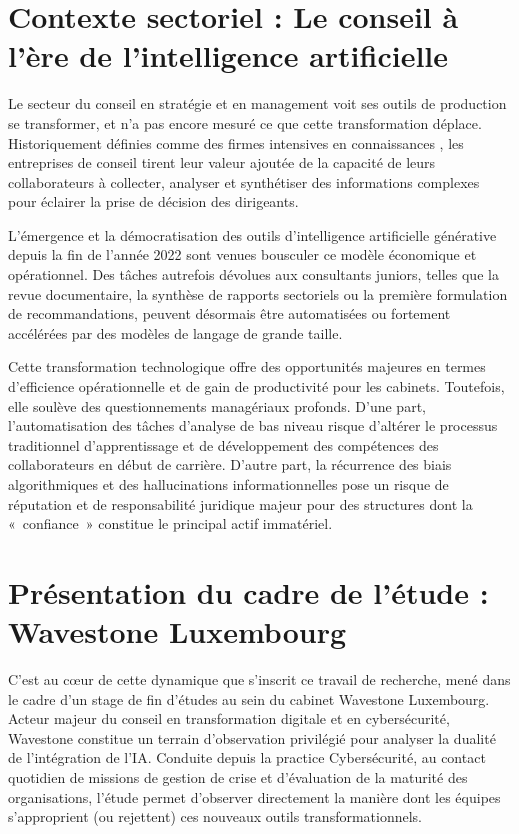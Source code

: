 \section{Contexte sectoriel : Le conseil à l'ère de l'intelligence artificielle}
Le secteur du conseil en stratégie et en management voit ses outils de production se transformer, et n'a pas encore mesuré ce que cette transformation déplace. Historiquement définies comme des firmes intensives en connaissances \cite{starbuck1992}, les entreprises de conseil tirent leur valeur ajoutée de la capacité de leurs collaborateurs à collecter, analyser et synthétiser des informations complexes pour éclairer la prise de décision des dirigeants. 

L'émergence et la démocratisation des outils d'intelligence artificielle générative depuis la fin de l'année 2022 sont venues bousculer ce modèle économique et opérationnel. Des tâches autrefois dévolues aux consultants juniors, telles que la revue documentaire, la synthèse de rapports sectoriels ou la première formulation de recommandations, peuvent désormais être automatisées ou fortement accélérées par des modèles de langage de grande taille. 

Cette transformation technologique offre des opportunités majeures en termes d'efficience opérationnelle et de gain de productivité pour les cabinets. Toutefois, elle soulève des questionnements managériaux profonds. D'une part, l'automatisation des tâches d'analyse de bas niveau risque d'altérer le processus traditionnel d'apprentissage et de développement des compétences des collaborateurs en début de carrière. D'autre part, la récurrence des biais algorithmiques et des hallucinations informationnelles pose un risque de réputation et de responsabilité juridique majeur pour des structures dont la «~confiance~» constitue le principal actif immatériel.

\section{Présentation du cadre de l'étude : Wavestone Luxembourg}
C'est au cœur de cette dynamique que s'inscrit ce travail de recherche, mené dans le cadre d'un stage de fin d'études au sein du cabinet Wavestone Luxembourg. Acteur majeur du conseil en transformation digitale et en cybersécurité, Wavestone constitue un terrain d'observation privilégié pour analyser la dualité de l'intégration de l'IA. Conduite depuis la practice Cybersécurité, au contact quotidien de missions de gestion de crise et d'évaluation de la maturité des organisations, l'étude permet d'observer directement la manière dont les équipes s'approprient (ou rejettent) ces nouveaux outils transformationnels.

